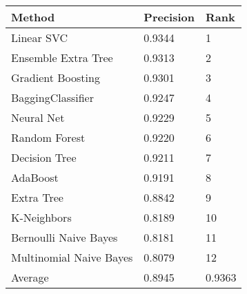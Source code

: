 \begin{tabular}{|l|l|l| }
\hline
Method                  & Precision & Rank \\ \hline
Linear SVC              & 0.9344 & 1\\
Ensemble Extra Tree     & 0.9313 & 2\\
Gradient Boosting       & 0.9301 & 3\\
BaggingClassifier       & 0.9247 & 4\\
Neural Net              & 0.9229 & 5\\
Random Forest           & 0.9220 & 6\\
Decision Tree           & 0.9211 & 7\\
AdaBoost                & 0.9191 & 8\\
Extra Tree              & 0.8842 & 9\\
K-Neighbors             & 0.8189 & 10\\
Bernoulli Naive Bayes   & 0.8181 & 11\\
Multinomial Naive Bayes & 0.8079 & 12\\
Average & 0.8945 & 0.9363 & \\
\hline
\end{tabular}